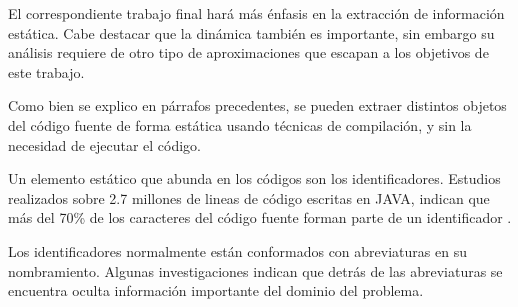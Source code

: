 \documentclass[a4paper,12pt]{report}
\begin{document}




\hspace{0.5cm} El correspondiente trabajo final hará más énfasis en la extracción de información estática. Cabe destacar que la dinámica también es importante, sin embargo su análisis requiere de otro tipo de aproximaciones que escapan a los objetivos de este trabajo. 

\hspace{0.5cm}Como bien se explico en párrafos precedentes, se pueden extraer distintos objetos del código fuente de forma estática usando técnicas de compilación, y sin la necesidad de ejecutar el código. 


\hspace{0.5cm}Un elemento estático que abunda en los códigos son los identificadores. Estudios realizados sobre 2.7 millones de lineas de código escritas en JAVA, indican que más del 70\% de los caracteres del código fuente forman parte de un identificador \cite{DFPM05,DMDJ13}.

\hspace{0.5cm}Los identificadores normalmente están conformados con abreviaturas en su nombramiento. Algunas investigaciones \cite{BCPT99,LFBEX07,EZH08,EHPV09} indican que detrás de las abreviaturas se encuentra oculta información importante del dominio del problema.
\end{document}
